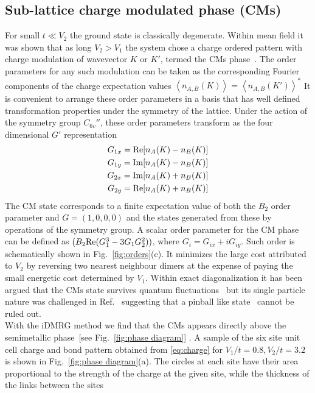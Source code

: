 \documentclass[aps,prx,10pt,twocolumn,floatfix,superscriptaddress,showpacs,numerical,footinbib]{revtex4-1}
\begin{document}
\subsection{Sub-lattice charge modulated phase (CMs)}
%
For small $t \ll V_{2}$ the ground state is classically degenerate. 
%
Within mean field it was shown that as long $V_{2}>V_{1}$ the system chose a charge ordered pattern with charge modulation of wavevector $K$ or $K'$, termed the CMs phase~\cite{GCC13}. 
%
The order parameters for any such modulation can be taken as the corresponding Fourier components of the charge expectation values $\left\langle n_{A,B}(K) \right\rangle = \left\langle n_{A,B}(K') \right\rangle^*$ 
%
It is convenient to arrange these order parameters in a basis that has well defined transformation properties under the symmetry of the lattice.
%
 Under the action of the symmetry group $C_{6v}''$, these order parameters transform as the four dimensional $G'$ representation 
\begin{align}
G_{1x} = {\rm Re}[n_{A}(K) -n_{B}(K)] \\
G_{1y} =  {\rm Im}[n_{A}(K) -n_{B}(K)] \\
G_{2x} =  {\rm Im}[n_{A}(K) +n_{B}(K)] \\
G_{2y} =  {\rm Re}[n_{A}(K) +n_{B}(K)]
\end{align}
The CM state corresponds to a finite expectation value of both the $B_2$ order parameter and $G = (1,0,0,0)$ and the states generated from these by operations of the symmetry group. A scalar order parameter for the CM phase can be defined as $(B_2 {\rm Re}(G_1^3-3G_1G_2^2))$, where $G_i = G_{ix}+iG_{iy}$. 
%
Such order is schematically shown in Fig.~\ref{fig:orders}(c). It minimizes the large cost
attributed to $V_{2}$ by reversing two nearest neighbour dimers at the expense of paying the small energetic cost determined by $V_{1}$.
%
Within exact diagonalization it has been argued that the CMs state survives quantum fluctuations~\cite{GGNVC13,DH14,DCH14} 
but its single particle nature was challenged in Ref.~ suggesting that a pinball like state~\cite{HF06,MRF13} cannot be ruled out.\\
%
With the iDMRG method we find that the CMs appears directly above the semimetallic phase~[see Fig.~\ref{fig:phase diagram}] .
%
A sample of the six site unit cell charge and bond pattern obtained from \eqref{eq:charge} for $V_1/t = 0.8, V_2/t = 3.2 $ is shown in Fig.~\ref{fig:phase diagram}(a).
%
The circles at each site have their area proportional to the strength of the charge at the given site, while the thickness of the links between the sites
\end{document}
